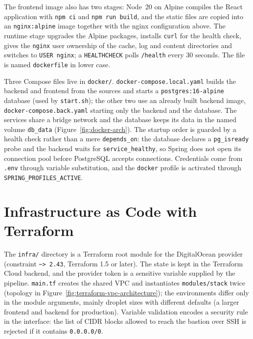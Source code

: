 The frontend image also has two stages: Node~20 on Alpine compiles the React application with \texttt{npm ci} and \texttt{npm run build}, and the static files are copied into an \texttt{nginx:alpine} image together with the nginx configuration above. The runtime stage upgrades the Alpine packages, installs \texttt{curl} for the health check, gives the \texttt{nginx} user ownership of the cache, log and content directories and switches to \texttt{USER nginx}; a \texttt{HEALTHCHECK} polls \texttt{/health} every 30 seconds. The file is named \texttt{dockerfile} in lower case.

Three Compose files live in \texttt{docker/}. \texttt{docker-compose.local.yaml} builds the backend and frontend from the sources and starts a \texttt{postgres:16-alpine} database (used by \texttt{start.sh}); the other two use an already built backend image, \texttt{docker-compose.back.yaml} starting only the backend and the database. The services share a bridge network and the database keeps its data in the named volume \texttt{db\_data} (Figure~\ref{fig:docker-arch}). The startup order is guarded by a health check rather than a mere \texttt{depends\_on}: the database declares a \texttt{pg\_isready} probe and the backend waits for \texttt{service\_healthy}, so Spring does not open its connection pool before PostgreSQL accepts connections. Credentials come from \texttt{.env} through variable substitution, and the \texttt{docker} profile is activated through \texttt{SPRING\_PROFILES\_ACTIVE}.



\section{Infrastructure as Code with Terraform}
\label{sec:impl-terraform}

The \texttt{infra/} directory is a Terraform root module for the DigitalOcean provider (constraint \texttt{\textasciitilde{}> 2.43}, Terraform 1.5 or later). The state is kept in the Terraform Cloud backend, and the provider token is a sensitive variable supplied by the pipeline. \texttt{main.tf} creates the shared VPC and instantiates \texttt{modules/stack} twice (topology in Figure~\ref{fig:terraform-vpc-architecture}); the environments differ only in the module arguments, mainly droplet sizes with different defaults (a larger frontend and backend for production). Variable validation encodes a security rule in the interface: the list of CIDR blocks allowed to reach the bastion over SSH is rejected if it contains \texttt{0.0.0.0/0}.

